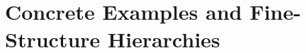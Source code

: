 \documentclass[12pt,reqno]{amsart}
\theoremstyle{definition}
\theoremstyle{remark}
\numberwithin{equation}{section}
\begin{document}
%
%
%

\section{Concrete Examples and Fine-Structure Hierarchies}
\end{document}

